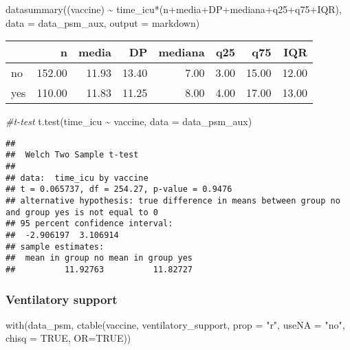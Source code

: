 \documentclass[
]{article}
\newenvironment{Shaded}{\begin{snugshade}}{\end{snugshade}}
\newcommand{\AttributeTok}[1]{\textcolor[rgb]{0.77,0.63,0.00}{#1}}
\newcommand{\CommentTok}[1]{\textcolor[rgb]{0.56,0.35,0.01}{\textit{#1}}}
\newcommand{\ConstantTok}[1]{\textcolor[rgb]{0.00,0.00,0.00}{#1}}
\newcommand{\FunctionTok}[1]{\textcolor[rgb]{0.00,0.00,0.00}{#1}}
\newcommand{\NormalTok}[1]{#1}
\newcommand{\SpecialCharTok}[1]{\textcolor[rgb]{0.00,0.00,0.00}{#1}}
\newcommand{\StringTok}[1]{\textcolor[rgb]{0.31,0.60,0.02}{#1}}
\begin{document}
\begin{Shaded}
\begin{Highlighting}[]
\FunctionTok{datasummary}\NormalTok{((vaccine) }\SpecialCharTok{\textasciitilde{}}\NormalTok{ time\_icu}\SpecialCharTok{*}\NormalTok{(n}\SpecialCharTok{+}\NormalTok{media}\SpecialCharTok{+}\NormalTok{DP}\SpecialCharTok{+}\NormalTok{mediana}\SpecialCharTok{+}\NormalTok{q25}\SpecialCharTok{+}\NormalTok{q75}\SpecialCharTok{+}\NormalTok{IQR),}
            \AttributeTok{data =}\NormalTok{ data\_psm\_aux, }\AttributeTok{output =} \StringTok{\textquotesingle{}markdown\textquotesingle{}}\NormalTok{)}
\end{Highlighting}
\end{Shaded}

\begin{longtable}[]{@{}lrrrrrrr@{}}
\toprule
& n & media & DP & mediana & q25 & q75 & IQR \\
\midrule
\endhead
no & 152.00 & 11.93 & 13.40 & 7.00 & 3.00 & 15.00 & 12.00 \\
yes & 110.00 & 11.83 & 11.25 & 8.00 & 4.00 & 17.00 & 13.00 \\
\bottomrule
\end{longtable}

\begin{Shaded}
\begin{Highlighting}[]
\CommentTok{\#t{-}test}
\FunctionTok{t.test}\NormalTok{(time\_icu }\SpecialCharTok{\textasciitilde{}}\NormalTok{ vaccine, }\AttributeTok{data =}\NormalTok{ data\_psm\_aux)}
\end{Highlighting}
\end{Shaded}

\begin{verbatim}
## 
##  Welch Two Sample t-test
## 
## data:  time_icu by vaccine
## t = 0.065737, df = 254.27, p-value = 0.9476
## alternative hypothesis: true difference in means between group no and group yes is not equal to 0
## 95 percent confidence interval:
##  -2.906197  3.106914
## sample estimates:
##  mean in group no mean in group yes 
##          11.92763          11.82727
\end{verbatim}

\hypertarget{ventilatory-support-1}{%
\subsubsection{Ventilatory support}\label{ventilatory-support-1}}

\begin{Shaded}
\begin{Highlighting}[]
\FunctionTok{with}\NormalTok{(data\_psm, }\FunctionTok{ctable}\NormalTok{(vaccine, ventilatory\_support, }\AttributeTok{prop =} \StringTok{"r"}\NormalTok{, }\AttributeTok{useNA =} \StringTok{"no"}\NormalTok{, }\AttributeTok{chisq =} \ConstantTok{TRUE}\NormalTok{, }\AttributeTok{OR=}\ConstantTok{TRUE}\NormalTok{))}
\end{Highlighting}
\end{Shaded}
\end{document}
